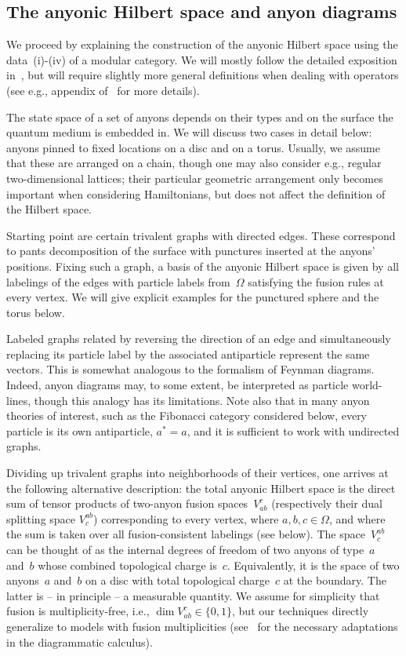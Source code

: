 \documentclass[floats,prb,twocolumn]{revtex4}
\begin{document}
\subsection{The anyonic Hilbert space and anyon diagrams}
 We proceed by explaining the construction of the anyonic Hilbert space using the data~(i)-(iv) of a modular category. We will mostly follow the detailed exposition in~\cite{Bondersonetal09}, but will require slightly more general definitions when dealing with operators  (see e.g., appendix of~\cite{KitaevAnyons} for more details). 

 The state space of a set of anyons depends on their types and on the surface the quantum medium is embedded in. We will discuss two cases in detail below: anyons pinned to fixed locations on a disc and on a torus. Usually,  we assume that these are arranged on a chain, though one may also consider e.g., regular two-dimensional lattices; their particular geometric arrangement only becomes important when considering Hamiltonians, but does not affect the definition of the Hilbert space.

 Starting point  are certain trivalent graphs with directed edges. These correspond to pants decomposition of the surface with punctures inserted at the anyons' positions. Fixing such a graph, a basis of the anyonic Hilbert space is given by all labelings of the edges with  particle labels from~$\Omega$ satisfying the fusion rules at every vertex. We will give explicit examples for the punctured sphere and the torus below. 

 Labeled graphs related by reversing the direction of an edge and simultaneously replacing its particle label by the associated antiparticle represent the same vectors. This is somewhat analogous to the formalism of Feynman diagrams. Indeed, anyon diagrams may, to some extent, be interpreted as particle world-lines, though this analogy has its limitations. Note also that in many anyon theories of interest, such as the Fibonacci category considered below, every particle is its own antiparticle, $a^*=a$, and it is sufficient to work with undirected graphs. 


Dividing up trivalent graphs into neighborhoods of their vertices, one arrives at the following  alternative description: the total anyonic Hilbert space is the direct sum of tensor products of  two-anyon fusion spaces~$V^{c}_{ab}$ (respectively their dual splitting space $V_c^{ab}$) corresponding to every vertex, where $a,b,c\in \Omega$, and where the sum is taken over all fusion-consistent labelings (see below).  The space~$V^{ab}_c$ can be thought of as the internal degrees of freedom of two anyons of type~$a$ and~$b$ whose combined topological charge is~$c$. Equivalently, it is the space of two anyons~$a$ and~$b$ on a disc with total topological charge~$c$ at the boundary. The latter is --  in principle -- a measurable quantity.  We assume for simplicity that fusion is multiplicity-free, i.e., $\dim V^c_{ab}\in\{0,1\}$, but our techniques directly generalize to models with fusion multiplicities (see~\cite{Bondersonetal09} for the necessary adaptations in the diagrammatic calculus).
\end{document}
